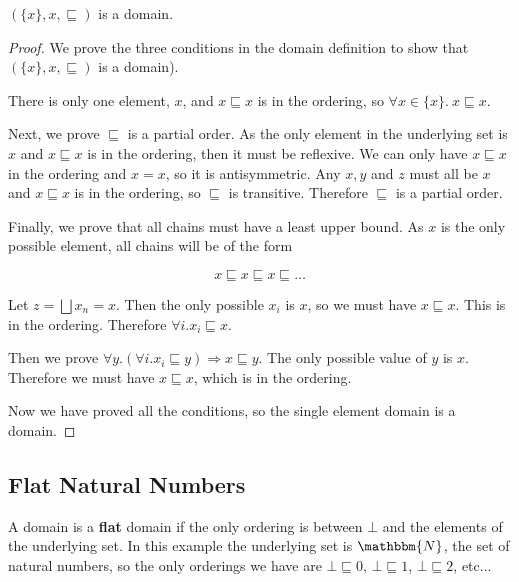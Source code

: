 \vspace{0.5cm}

\begin{lem}
$(\{x\},x,\sqsubseteq)$ is a domain.
\end{lem}

\begin{proof}
We prove the three conditions in the domain definition to show that $(\{x\},x,\sqsubseteq)$ is a domain).

There is only one element, $x$, and $x \sqsubseteq x$ is in the ordering, so $\forall x \in \{x\}. \ x \sqsubseteq x$.

Next, we prove $\sqsubseteq$ is a partial order. As the only element in the underlying set is $x$ and $x \sqsubseteq x$ is in the ordering, then it must be  reflexive. We can only have $x \sqsubseteq x$ in the ordering and $x = x$, so it is antisymmetric.
Any $x,y$ and $z$ must all be $x$ and $x \sqsubseteq x$ is in the ordering, so $\sqsubseteq$ is transitive. Therefore $\sqsubseteq$ is a partial order.


Finally, we prove that all chains must have a least upper bound. As $x$ is the only possible element, all chains will be of the form 

\[ x \sqsubseteq x  \sqsubseteq x  \sqsubseteq \dots \]

Let $z = \bigsqcup x_n = x$. Then the only possible $x_i$ is $x$, so we must have $x \sqsubseteq x$. This is in the ordering. Therefore $\forall i. x_i \sqsubseteq x$.

Then we prove $\forall y. (\forall i . x_i \sqsubseteq y) \Rightarrow x \sqsubseteq y$. The only possible value of $y$ is $x$. Therefore we must have $x \sqsubseteq x$, which is in the ordering.

\vspace{0.25cm}

Now we have proved all the conditions, so the single element domain is a domain.
\end{proof}

\subsection{Flat Natural Numbers}\label{flat} A domain is a \textbf{flat} domain if  the only ordering is between $\bot$ and the elements of the underlying set. In this example the underlying set is  $\mathbbm{N}$, the set of natural numbers, so the only orderings we have are $\bot \sqsubseteq 0$, $\bot \sqsubseteq 1$, $\bot \sqsubseteq 2$, etc... 

